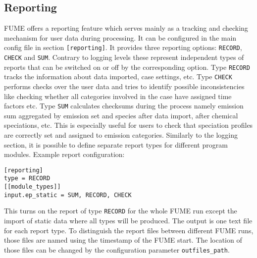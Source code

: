 \documentclass[a4paper,11pt]{article}
\begin{document}
\subsection{Reporting}\label{reporting}
FUME offers a reporting feature which serves mainly as a tracking and checking mechanism for user data during processing. It can be configured in the main config file in section \verb|[reporting]|. It provides three reporting options: \verb|RECORD|, \verb|CHECK| and \verb|SUM|. Contrary to logging levels these represent independent types of reports that can be switched on or off by the corresponding option. Type \verb|RECORD| tracks the information about data imported, case settings, etc. Type \verb|CHECK| performs checks over the user data and tries to identify possible inconsistencies like checking whether all categories involved in the case have assigned time factors etc. Type \verb|SUM| calculates checksums during the process namely emission sum aggregated by emission set and species after data import, after chemical speciations, etc. This is especially useful for users to check that speciation profiles are correctly set and assigned to emission categories. Similarly to the logging section, it is possible to define separate report types for different program modules. Example report configuration:
\begin{verbatim}
[reporting]
type = RECORD
[[module_types]]
input.ep_static = SUM, RECORD, CHECK
\end{verbatim}
This turns on the report of type \verb|RECORD| for the whole FUME run except the import of static data where all types will be produced. The output is one text file for each report type. To distinguish the report files between different FUME runs, those files are named using the timestamp of the FUME start. The location of those files can be changed by the configuration parameter \verb|outfiles_path|.
\end{document}
